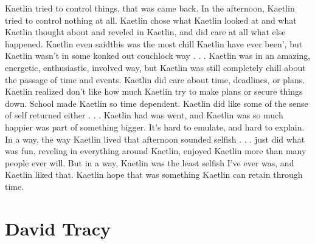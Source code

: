 \documentclass[12pt]{book}
\begin{document}
Kaetlin tried to control things, that was came back. In the afternoon, Kaetlin tried to control nothing at all. Kaetlin chose what Kaetlin looked at and what Kaetlin thought about and reveled in Kaetlin, and did care at all what else happened. Kaetlin even saidthis was the most chill Kaetlin have ever been', but Kaetlin wasn't in some konked out couchlock way . . .  Kaetlin was in an amazing, energetic, enthusiastic, involved way, but Kaetlin was still completely chill about the passage of time and events. Kaetlin did care about time, deadlines, or plans. Kaetlin realized don't like how much Kaetlin try to make plans or secure things down. School made Kaetlin so time dependent. Kaetlin did like some of the sense of self returned either . . .  Kaetlin had was went, and Kaetlin was so much happier was part of something bigger. It's hard to emulate, and hard to explain. In a way, the way Kaetlin lived that afternoon sounded selfish . . .  just did what was fun, reveling in everything around Kaetlin, enjoyed Kaetlin more than many people ever will. But in a way, Kaetlin was the least selfish I've ever was, and Kaetlin liked that. Kaetlin hope that was something Kaetlin can retain through time.






\chapter{David Tracy}
\end{document}
